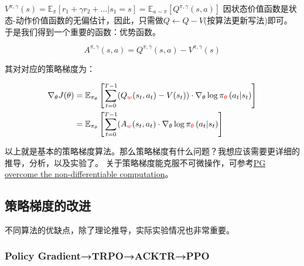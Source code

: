 \documentclass[UTF8]{ctexart}
\begin{document}
$V^{\pi, \gamma}(s)=\mathbb{E}_{\pi}\left[r_{1}+\gamma r_{2}+\ldots | s_{1}=s\right]=\mathbb{E}_{a \sim \pi}[Q^{\pi, \gamma}(s,a)]$
因状态价值函数是状态-动作价值函数的无偏估计，因此，只需做$Q \leftarrow Q -V$(按算法更新写法)即可。
于是我们得到一个重要的函数：优势函数。
\begin{definition}
    $$A^{\pi, \gamma}(s, a) = Q^{\pi, \gamma}(s, a) - V^{\pi, \gamma}(s) $$
\end{definition}

其对对应的策略梯度为：

\begin{equation} \label{JAC}  \begin{aligned}\nabla_{\theta} J(\theta)&=\mathbb{E}_{\pi_{\theta}}\left[\sum_{t=0}^{T-1} (Q_{{\color{red} w}}(s_t, a_t) - V(s_t))
\cdot \nabla_{\theta} \log \pi_{{\color{red} \theta}}\left(a_{t} | s_{t}\right)\right] \\
&= \mathbb{E}_{\pi_{\theta}}\left[\sum_{t=0}^{T-1} (A_{{\color{red} w}}(s_t, a_t)
\cdot \nabla_{\theta} \log \pi_{{\color{red} \theta}}\left(a_{t} | s_{t}\right)\right] \end{aligned}
\end{equation}

以上就是基本的策略梯度算法。那么策略梯度有什么问题？我想应该需要更详细的推导，分析，以及实验了。
关于策略梯度能克服不可微操作，可参考\href{http://karpathy.github.io/2016/05/31/rl/}{PG overcome the non-differentiable computation}。

\subsection{策略梯度的改进}
不同算法的优缺点，除了理论推导，实际实验情况也非常重要。
\subsubsection{Policy Gradient→TRPO→ACKTR→PPO}
\end{document}
